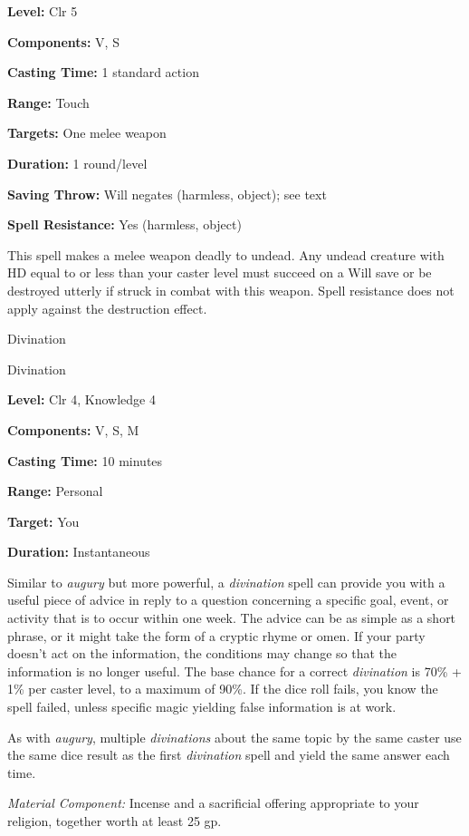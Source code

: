 \documentclass{article}
\begin{document}
\textbf{Level:} Clr 5

\textbf{Components:} V, S

\textbf{Casting Time:} 1 standard action

\textbf{Range:} Touch

\textbf{Targets:} One melee weapon

\textbf{Duration:} 1 round/level

\textbf{Saving Throw: }Will negates (harmless, object); see text

\textbf{Spell Resistance:} Yes (harmless, object)

This spell makes a melee weapon deadly to undead. Any undead creature with HD equal 
to or less than your caster level must succeed on a Will save or be destroyed utterly 
if struck in combat with this weapon. Spell resistance does not apply against the 
destruction effect.

\vspace{12pt}
Divination

Divination

\textbf{Level:} Clr 4, Knowledge 4

\textbf{Components:} V, S, M

\textbf{Casting Time:} 10 minutes

\textbf{Range:} Personal

\textbf{Target:} You

\textbf{Duration:} Instantaneous 

Similar to \textit{augury }but more powerful, a \textit{divination }spell can provide 
you with a useful piece of advice in reply to a question concerning a specific 
goal, event, or activity that is to occur within one week. The advice can be as 
simple as a short phrase, or it might take the form of a cryptic rhyme or omen. 
If your party doesn't act on the information, the conditions may change so that 
the information is no longer useful. The base chance for a correct \textit{divination 
}is 70\% + 1\% per caster level, to a maximum of 90\%. If the dice roll fails, 
you know the spell failed, unless specific magic yielding false information is 
at work.

As with \textit{augury}, multiple \textit{divinations }about the same topic by 
the same caster use the same dice result as the first \textit{divination }spell 
and yield the same answer each time.

\textit{Material Component: }Incense and a sacrificial offering appropriate to 
your religion, together worth at least 25 gp.
\end{document}
